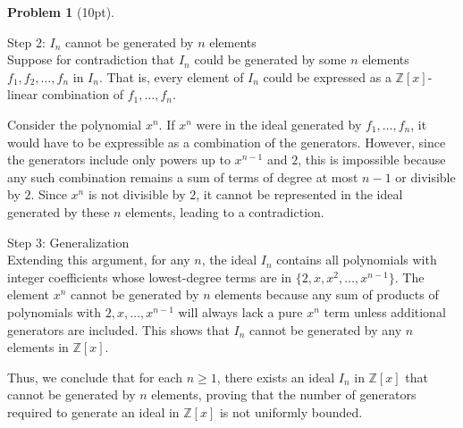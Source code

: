 \documentclass[12pt]{article}
\theoremstyle{definition}
\newtheorem{problem}{Problem}
\begin{document}
\begin{problem}[10pt]
\begin{solution}
            Step 2: $I_n$ cannot be generated by $n$ elements\\
            Suppose for contradiction that $I_n$ could be generated by some $n$ elements $f_1, f_2, \dots, f_n$ in $I_n$. That is, every element of $I_n$ could be expressed as a $\mathbb{Z}[x]$-linear combination of $f_1, \dots, f_n$. 
            
            Consider the polynomial $x^n$. If $x^n$ were in the ideal generated by $f_1, \dots, f_n$, it would have to be expressible as a combination of the generators. However, since the generators include only powers up to $x^{n-1}$ and $2$, this is impossible because any such combination remains a sum of terms of degree at most $n-1$ or divisible by $2$. Since $x^n$ is not divisible by $2$, it cannot be represented in the ideal generated by these $n$ elements, leading to a contradiction.
            
            Step 3: Generalization\\
            Extending this argument, for any $n$, the ideal $I_n$ contains all polynomials with integer coefficients whose lowest-degree terms are in $\{2, x, x^2, \dots, x^{n-1}\}$. The element $x^n$ cannot be generated by $n$ elements because any sum of products of polynomials with $2, x, \dots, x^{n-1}$ will always lack a pure $x^n$ term unless additional generators are included. This shows that $I_n$ cannot be generated by any $n$ elements in $\mathbb{Z}[x]$.
            
            Thus, we conclude that for each $n \geq 1$, there exists an ideal $I_n$ in $\mathbb{Z}[x]$ that cannot be generated by $n$ elements, proving that the number of generators required to generate an ideal in $\mathbb{Z}[x]$ is not uniformly bounded.
      \end{solution}
\end{problem}
\end{document}
